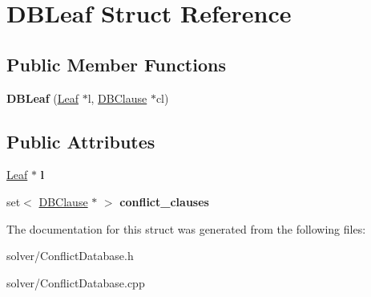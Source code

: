 \hypertarget{structDBLeaf}{\section{\-D\-B\-Leaf \-Struct \-Reference}
\label{structDBLeaf}
}
\subsection*{\-Public \-Member \-Functions}
\begin{DoxyCompactItemize}
\item 
\hypertarget{structDBLeaf_a714cc4ffefeadf3ff13b9ba448010a12}{{\bfseries \-D\-B\-Leaf} (\hyperlink{classLeaf}{\-Leaf} $\ast$l, \hyperlink{structDBClause}{\-D\-B\-Clause} $\ast$cl)}\label{structDBLeaf_a714cc4ffefeadf3ff13b9ba448010a12}

\end{DoxyCompactItemize}
\subsection*{\-Public \-Attributes}
\begin{DoxyCompactItemize}
\item 
\hypertarget{structDBLeaf_a5c755dbd54d03d5a0a835c61c2396342}{\hyperlink{classLeaf}{\-Leaf} $\ast$ {\bfseries l}}\label{structDBLeaf_a5c755dbd54d03d5a0a835c61c2396342}

\item 
\hypertarget{structDBLeaf_af8cc3f3efcb7cab4ddbade082ce81b21}{set$<$ \hyperlink{structDBClause}{\-D\-B\-Clause} $\ast$ $>$ {\bfseries conflict\-\_\-clauses}}\label{structDBLeaf_af8cc3f3efcb7cab4ddbade082ce81b21}

\end{DoxyCompactItemize}


\-The documentation for this struct was generated from the following files\-:\begin{DoxyCompactItemize}
\item 
solver/\-Conflict\-Database.\-h\item 
solver/\-Conflict\-Database.\-cpp\end{DoxyCompactItemize}
